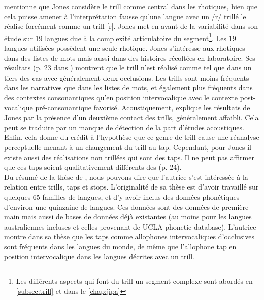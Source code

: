 \textcite[23]{punnooseAuditoryAcousticStudy2010} mentionne que Jones considère le trill comme central dans les rhotiques, bien que cela puisse amener à l'interprétation fausse qu'une langue avec un /r/ trillé le réalise forcément comme un trill [r]. Jones met en avant de la variabilité dans son étude sur 19 langues due à la complexité articulatoire du segment\footnote{Les différents aspects qui font du trill un segment complexe sont abordés en \autoref{subsec:trill} et dans le \autoref{chap:jipa}}. Les 19 langues utilisées possèdent une seule rhotique. Jones s'intéresse aux rhotiques dans des listes de mots mais aussi dans des histoires  récoltées en laboratoire. Ses résultats (p. 23 dans \textcite{punnooseAuditoryAcousticStudy2010}) montrent que le trill n'est réalisé comme tel que dans un tiers des cas avec généralement deux occlusions. Les trills sont moins fréquents dans les narratives que dans les listes de mots, et également plus fréquents dans des contextes consonantiques qu'en position intervocalique avec le contexte post-vocalique pré-consonantique favorisé.
Acoustiquement, \textcite[24]{punnooseAuditoryAcousticStudy2010} explique les résultats de Jones par la présence d'un deuxième contact des trills, généralement affaibli. Cela peut se traduire par un manque de détection de la part d'études acoustiques. Enfin, cela donne du crédit à l'hypothèse que ce genre de trill cause une réanalyse perceptuelle menant à un changement du trill au tap. Cependant, pour Jones il existe aussi des réalisations non trillées qui sont des taps. Il ne peut pas affirmer que ces taps soient qualitativement différents des  (p. 24).\\

Du résumé de la thèse de \textcite{inouyeTrillsTapsStops1995}, nous pouvons dire que l'autrice s'est intéressée à la relation entre trills, taps et stops. L'originalité de sa thèse est d'avoir travaillé sur quelques 65 familles de langues, et d'y avoir inclus des données phonétiques d'environ une quinzaine de langues. Ces données sont des données de première main mais aussi de bases de données déjà existantes (au moins pour les langues australiennes incluses et celles provenant de UCLA phonetic database). L'autrice montre dans sa thèse que les taps comme allophones intervocaliques d'occlusives sont fréquents dans les langues du monde, de même que l'allophone tap en position intervocalique dans les langues décrites avec un trill.\\

